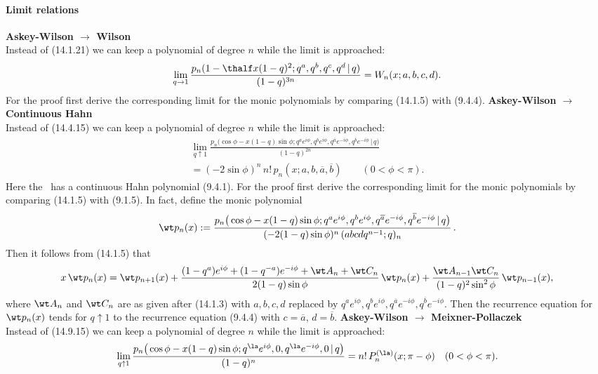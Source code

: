 \documentclass[envcountchap,graybox]{svmono}
\newcounter{rom}
\begin{document}
\paragraph{Limit relations}\quad\sLP
{\bf Askey-Wilson $\longrightarrow$ Wilson}\\
Instead of (14.1.21) we can keep a polynomial of degree $n$ while the limit is approached:
\begin{equation}
\lim_{q\to1}\frac{p_n(1-\thalf x(1-q)^2;q^a,q^b,q^c,q^d\,|\, q)}{(1-q)^{3n}}
=W_n(x;a,b,c,d).
\label{109}
\end{equation}
For the proof first derive the corresponding limit for the monic polynomials by comparing
(14.1.5) with (9.4.4).
\bLP
{\bf Askey-Wilson $\longrightarrow$ Continuous Hahn}\\
Instead of (14.4.15) we can keep a polynomial of degree $n$ while the limit is approached:
\begin{multline}
\lim_{q\uparrow1}
\frac{p_n\big(\cos\phi-x(1-q)\sin\phi;q^a e^{i\phi},q^b e^{i\phi},q^{\overline a} e^{-i\phi},
q^{\overline b} e^{-i\phi}\,|\, q\big)}
{(1-q)^{2n}}\\
=(-2\sin\phi)^n\,n!\,p_n(x;a,b,\overline a,\overline b)\qquad
(0<\phi<\pi).
\label{177}
\end{multline}
Here the \RHS\ has a continuous Hahn polynomial (9.4.1).
For the proof first derive the corresponding limit for the monic polynomials by comparing
(14.1.5) with (9.1.5).
In fact, define the monic polynomial
\[
\wt p_n(x):=
\frac{p_n\big(\cos\phi-x(1-q)\sin\phi;q^a e^{i\phi},q^b e^{i\phi},q^{\overline a} e^{-i\phi},
q^{\overline b} e^{-i\phi}\,|\, q\big)}
{(-2(1-q)\sin\phi)^n\,(abcdq^{n-1};q)_n}\,.
\]
Then it follows from (14.1.5) that
\begin{equation*}
x\,\wt p_n(x)=\wt p_{n+1}(x)
+\frac{(1-q^a)e^{i\phi}+(1-q^{-a})e^{-i\phi}+\wt A_n+\wt C_n}{2(1-q)\sin\phi}\,\wt p_n(x)\\
+\frac{\wt A_{n-1} \wt C_n}{(1-q)^2 \sin^2\phi}\,\wt p_{n-1}(x),
\end{equation*}
where $\wt A_n$ and $\wt C_n$ are as given after (14.1.3) with $a,b,c,d$ replaced by
$q^a e^{i\phi},q^b e^{i\phi},q^{\overline a} e^{-i\phi},q^{\overline b} e^{-i\phi}$.
Then the recurrence equation for $\wt p_n(x)$ tends for $q\uparrow 1$ to
the recurrence equation (9.4.4) with $c=\overline a$, $d=\overline b$.
\bLP
{\bf Askey-Wilson $\longrightarrow$ Meixner-Pollaczek}\\
Instead of (14.9.15) we can keep a polynomial of degree $n$ while the limit is approached:
\begin{equation}
\lim_{q\uparrow1}
\frac{p_n\big(\cos\phi-x(1-q)\sin\phi;
q^\la e^{i\phi},0,q^\la e^{-i\phi},0\,|\, q\big)}{(1-q)^n}
=n!\,P_n^{(\la)}(x;\pi-\phi)\quad
(0<\phi<\pi).
\label{178}
\end{equation}
\end{document}
